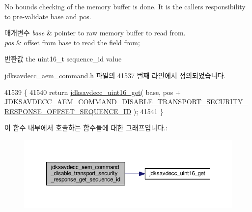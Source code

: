 No bounds checking of the memory buffer is done. It is the caller\textquotesingle{}s responsibility to pre-\/validate base and pos.


\begin{DoxyParams}{매개변수}
{\em base} & pointer to raw memory buffer to read from. \\
\hline
{\em pos} & offset from base to read the field from; \\
\hline
\end{DoxyParams}
\begin{DoxyReturn}{반환값}
the uint16\+\_\+t sequence\+\_\+id value 
\end{DoxyReturn}


jdksavdecc\+\_\+aem\+\_\+command.\+h 파일의 41537 번째 라인에서 정의되었습니다.


\begin{DoxyCode}
41539 \{
41540     \textcolor{keywordflow}{return} \hyperlink{group__endian_ga3fbbbc20be954aa61e039872965b0dc9}{jdksavdecc\_uint16\_get}( base, pos + 
      \hyperlink{group__command__disable__transport__security__response_ga3e93bcccdc12dfb34d7b8bcc1cf31e63}{JDKSAVDECC\_AEM\_COMMAND\_DISABLE\_TRANSPORT\_SECURITY\_RESPONSE\_OFFSET\_SEQUENCE\_ID}
       );
41541 \}
\end{DoxyCode}


이 함수 내부에서 호출하는 함수들에 대한 그래프입니다.\+:
\nopagebreak
\begin{figure}[H]
\begin{center}
\leavevmode
\includegraphics[width=350pt]{group__command__disable__transport__security__response_gaadec7eaa22bff01d25083b04f081b806_cgraph}
\end{center}
\end{figure}


